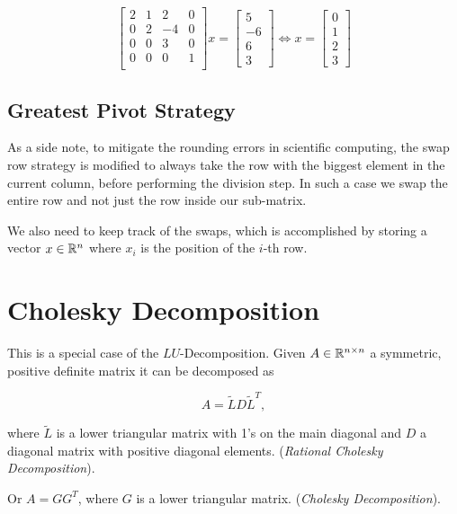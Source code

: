 \[
    \begin{bmatrix} 
        2 & 1 & 2 & 0 \\  
        0 & 2 & -4 & 0 \\  
        0 & 0 & 3 & 0 \\
        0 & 0 & 0 & 1 \\ 
    \end{bmatrix}
    x = 
    \begin{bmatrix}
        5 \\ 
        -6 \\
        6 \\ 
        3  
    \end{bmatrix}
    \iff
    x =
    \begin{bmatrix}
        0 \\ 
        1 \\ 
        2 \\
        3
    \end{bmatrix}
\]

\subsection{Greatest Pivot Strategy}

As a side note, to mitigate the rounding errors in scientific computing, the swap row strategy is 
modified to always take the row with the biggest element in the current column, before performing the division step. In such a case we swap the entire row 
and not just the row inside our sub-matrix. 

We also need to keep track of the swaps, which is accomplished by storing a vector \(x \in \mathbb{R}^n\) where \(x_i\) is the position of the \(i\)-th row.

\section{Cholesky Decomposition}

This is a special case of the \(LU\)-Decomposition. Given \(A \in \mathbb{R}^{n \times n}\) a symmetric, positive definite matrix it can be decomposed as 

\[
    A = \tilde{L}D\tilde{L}^T,
\]

where \(\tilde{L}\) is a lower triangular matrix with 1's on the main diagonal and \(D\) a diagonal matrix with positive 
diagonal elements. (\emph{Rational Cholesky Decomposition}).

Or \(A = G G^T\), where \(G\) is a lower triangular matrix. (\emph{Cholesky Decomposition}).

